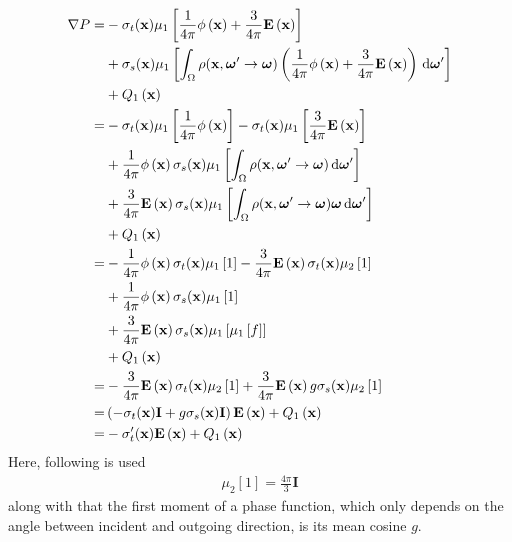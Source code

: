 \begin{align*}
\nabla P =&
-\sigma_t(\boldsymbol{\mathbf{x}})\mu_1\left[\frac{1}{4\pi}\phi\left(\boldsymbol{\mathbf{x}}\right) + \frac{3}{4\pi}\boldsymbol{\mathbf{E}}\left(\boldsymbol{\mathbf{x}}\right)\right]
\\&
+\sigma_s(\boldsymbol{\mathbf{x}})\mu_1\left[\int_{\Omega}\rho(\boldsymbol{\mathbf{x}}, \boldsymbol{\mathbf{\omega}}'\rightarrow\boldsymbol{\mathbf{\omega}})\left(\frac{1}{4\pi}\phi\left(\boldsymbol{\mathbf{x}}\right) + \frac{3}{4\pi}\boldsymbol{\mathbf{E}}\left(\boldsymbol{\mathbf{x}}\right)\right)\,\mathrm{d}\boldsymbol{\mathbf{\omega}}'\right]
\\&
\nonumber
+ Q_1\left(\boldsymbol{\mathbf{x}}\right)
\\
=&
-\sigma_t(\boldsymbol{\mathbf{x}})\mu_1\left[\frac{1}{4\pi}\phi\left(\boldsymbol{\mathbf{x}}\right)\right]
-\sigma_t(\boldsymbol{\mathbf{x}})\mu_1\left[\frac{3}{4\pi}\boldsymbol{\mathbf{E}}\left(\boldsymbol{\mathbf{x}}\right)\right]
\\
&
+\frac{1}{4\pi}\phi\left(\boldsymbol{\mathbf{x}}\right)\sigma_s(\boldsymbol{\mathbf{x}})\mu_1\left[\int_{\Omega}\rho(\boldsymbol{\mathbf{x}}, \boldsymbol{\mathbf{\omega}}'\rightarrow\boldsymbol{\mathbf{\omega}})\,\mathrm{d}\boldsymbol{\mathbf{\omega}}'\right]
\\
&
+\frac{3}{4\pi}\boldsymbol{\mathbf{E}}\left(\boldsymbol{\mathbf{x}}\right)\sigma_s(\boldsymbol{\mathbf{x}})\mu_1\left[\int_{\Omega}\rho(\boldsymbol{\mathbf{x}}, \boldsymbol{\mathbf{\omega}}'\rightarrow\boldsymbol{\mathbf{\omega}})\boldsymbol{\mathbf{\omega}}\,\mathrm{d}\boldsymbol{\mathbf{\omega}}'\right]
\\
&
+Q_1\left(\boldsymbol{\mathbf{x}}\right)
\\
=&
-\frac{1}{4\pi}\phi\left(\boldsymbol{\mathbf{x}}\right)\sigma_t(\boldsymbol{\mathbf{x}})\mu_1\left[1\right]
-\frac{3}{4\pi}\boldsymbol{\mathbf{E}}\left(\boldsymbol{\mathbf{x}}\right)\sigma_t(\boldsymbol{\mathbf{x}})\mu_2\left[1\right]
\\
&
+\frac{1}{4\pi}\phi\left(\boldsymbol{\mathbf{x}}\right)\sigma_s(\boldsymbol{\mathbf{x}})\mu_1\left[1\right]
\\
&
+\frac{3}{4\pi}\boldsymbol{\mathbf{E}}\left(\boldsymbol{\mathbf{x}}\right)\sigma_s(\boldsymbol{\mathbf{x}})\mu_1\left[\mu_1\left[f\right]\right]
\\
&
+Q_1\left(\boldsymbol{\mathbf{x}}\right)
\\
=&
-\frac{3}{4\pi}\boldsymbol{\mathbf{E}}\left(\boldsymbol{\mathbf{x}}\right)\sigma_t(\boldsymbol{\mathbf{x}})\mu_2\left[1\right]
+\frac{3}{4\pi}\boldsymbol{\mathbf{E}}\left(\boldsymbol{\mathbf{x}}\right)g\sigma_s(\boldsymbol{\mathbf{x}})\mu_2\left[1\right]
\\
=&
\left(-\sigma_t(\boldsymbol{\mathbf{x}})\mathbf{I} + g\sigma_s(\boldsymbol{\mathbf{x}})\mathbf{I}\right)\boldsymbol{\mathbf{E}}\left(\boldsymbol{\mathbf{x}}\right)
+Q_1\left(\boldsymbol{\mathbf{x}}\right)
\\
=&
-\sigma_t'(\boldsymbol{\mathbf{x}})\boldsymbol{\mathbf{E}}\left(\boldsymbol{\mathbf{x}}\right)
+Q_1\left(\boldsymbol{\mathbf{x}}\right)
\end{align*}
Here, following is used
\begin{align*}
\mu_2[1] = \frac{4\pi}{3}\mathbf{I}
\end{align*}
along with that the first moment of a phase function, which only depends on the angle between incident and outgoing direction, is its mean cosine $g$.

